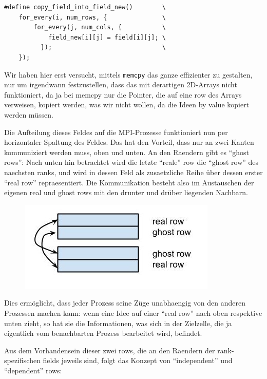 \begin{verbatim}
#define copy_field_into_field_new()        \
    for_every(i, num_rows, {               \
        for_every(j, num_cols, {           \
            field_new[i][j] = field[i][j]; \
          });                              \
    });
\end{verbatim}

Wir haben hier erst versucht, mittels \texttt{memcpy} das ganze
effizienter zu gestalten, nur um irgendwann festzustellen, dass das mit
derartigen 2D-Arrays nicht funktioniert, da ja bei memcpy nur die
Pointer, die auf eine row des Arrays verweisen, kopiert werden, was wir
nicht wollen, da die Ideen by value kopiert werden müssen.

Die Aufteilung dieses Feldes auf die MPI-Prozesse funktioniert nun per
horizontaler Spaltung des Feldes. Das hat den Vorteil, dass nur an zwei
Kanten kommuniziert werden muss, oben und unten. An den Raendern gibt es
``ghost rows'': Nach unten hin betrachtet wird die letzte ``reale'' row
die ``ghost row'' des naechsten ranks, und wird in dessen Feld als
zusaetzliche Reihe über dessen erster ``real row'' repraesentiert. Die
Kommunikation besteht also im Austauschen der eigenen real und ghost
rows mit den drunter und drüber liegenden Nachbarn.

\begin{figure}[htbp]
\centering
\includegraphics{pics/real-ghost-rows.jpg}
\end{figure}

Dies ermöglicht, dass jeder Prozess seine Züge unabhaengig von den
anderen Prozessen machen kann: wenn eine Idee auf einer ``real row''
nach oben respektive unten zieht, so hat sie die Informationen, was sich
in der Zielzelle, die ja eigentlich vom benachbarten Prozess bearbeitet
wird, befindet.

Aus dem Vorhandensein dieser zwei rows, die an den Raendern der
rank-spezifischen fields jeweils sind, folgt das Konzept von
``independent'' und ``dependent'' rows:


